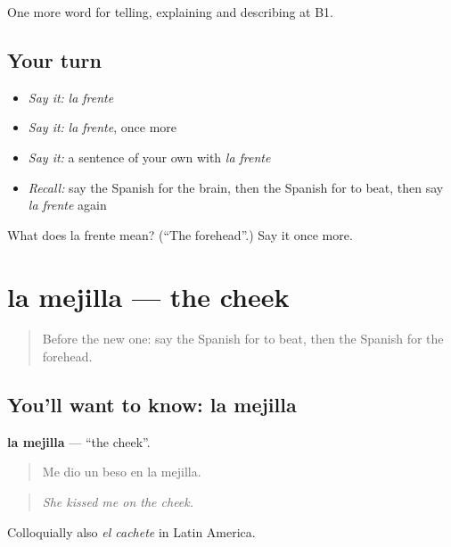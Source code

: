\begin{grammarlens}[title={What you've built}]
One more word for telling, explaining and describing at B1.
\end{grammarlens}

\subsection*{Your turn}
\begin{itemize}
\raggedright
  \item \emph{Say it:} \emph{la frente}
  \item \emph{Say it:} \emph{la frente}, once more
  \item \emph{Say it:} a sentence of your own with \emph{la frente}
  \item \emph{Recall:} say the Spanish for the brain, then the Spanish for to beat, then say \emph{la frente} again
\end{itemize}

\begin{tcolorbox}[breakable,colback=teal!4,colframe=teal!35!black,title={Before you move on}]
What does la frente mean? (\textquotedblleft{}The forehead\textquotedblright{}.) Say it once more.
\end{tcolorbox}
\section[la mejilla]{la mejilla — the cheek}

\label{lesson:ES-C736-mejilla}



\begin{quote}
Before the new one: say the Spanish for to beat, then the Spanish for the forehead.
\end{quote}

\subsection*{You'll want to know: la mejilla}
\textbf{la mejilla} — \textquotedblleft{}the cheek\textquotedblright{}.

\begin{quote}
Me dio un beso en la mejilla.
\end{quote}

\begin{quote}
\emph{She kissed me on the cheek.}
\end{quote}

Colloquially also \emph{el cachete} in Latin America.

